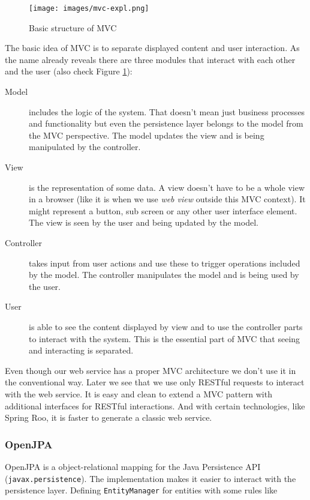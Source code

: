 \begin{figure}\centering
		\texttt{[image: images/mvc-expl.png]}
		\caption{Basic structure of MVC}
		\label{mvc-expl}
\end{figure} 


The basic idea of MVC is to separate displayed content and user interaction. As the name already reveals there are three modules that interact with each other and the user (also check Figure \ref{mvc-expl}):

\begin{description}
\item[Model] includes the logic of the system. That doesn't mean just business processes and functionality but even the persistence layer belongs to the model from the MVC perspective. 
The model updates the view and is being manipulated by the controller.

\item[View] is the representation of some data. A view doesn't have to be a whole view in a browser (like it is when we use \emph{web view} outside this MVC context). It might represent a button, sub screen or any other user interface element.
The view is seen by the user and being updated by the model.

\item[Controller] takes input from user actions and use these to trigger operations included by the model. 
The controller manipulates the model and is being used by the user.

\item[User] is able to see the content displayed by view and to use the controller parts to interact with the system. This is the essential part of MVC that seeing and interacting is separated. 
\end{description}

Even though our web service has a proper MVC architecture we don't use it in the conventional way. Later we see that we use only RESTful requests to interact with the web service. It is easy and clean to extend a MVC pattern with additional interfaces for RESTful interactions. And with certain technologies, like Spring Roo, it is faster to generate a classic web service.

\subsubsection*{OpenJPA}
OpenJPA is a object-relational mapping for the Java Persistence API (\sloppy \verb^javax.persistence^). The implementation makes it easier to interact with the persistence layer. Defining \verb^EntityManager^ for entities with some rules like

